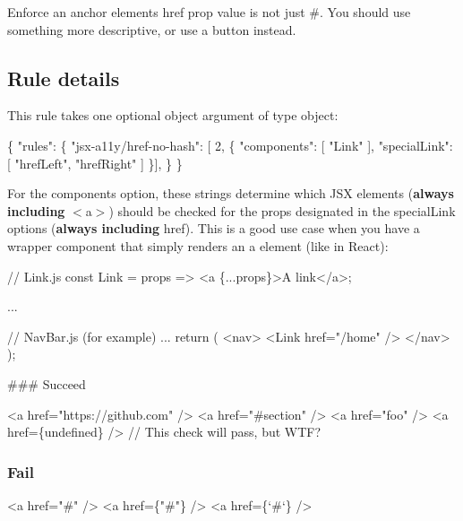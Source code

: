 Enforce an anchor element\textquotesingle{}s href prop value is not just \#. You should use something more descriptive, or use a button instead.

\subsection*{Rule details}

This rule takes one optional object argument of type object\+:


\begin{DoxyCode}
\{
    "rules": \{
        "jsx-a11y/href-no-hash": [ 2, \{
            "components": [ "Link" ],
            "specialLink": [ "hrefLeft", "hrefRight" ]
          \}],
    \}
\}
\end{DoxyCode}


For the {\ttfamily components} option, these strings determine which J\+SX elements ({\bfseries always including} {\ttfamily $<$a$>$}) should be checked for the props designated in the {\ttfamily special\+Link} options ({\bfseries always including} {\ttfamily href}). This is a good use case when you have a wrapper component that simply renders an {\ttfamily a} element (like in React)\+:


\begin{DoxyCode}
// Link.js
const Link = props => <a \{...props\}>A link</a>;

...

// NavBar.js (for example)
...
return (
  <nav>
    <Link href="/home" />
  </nav>
);
\end{DoxyCode}


\#\#\# Succeed 
\begin{DoxyCode}
<a href="https://github.com" />
<a href="#section" />
<a href="foo" />
<a href=\{undefined\} /> // This check will pass, but WTF?
\end{DoxyCode}


\subsubsection*{Fail}


\begin{DoxyCode}
<a href="#" />
<a href=\{"#"\} />
<a href=\{`#`\} />
\end{DoxyCode}
 